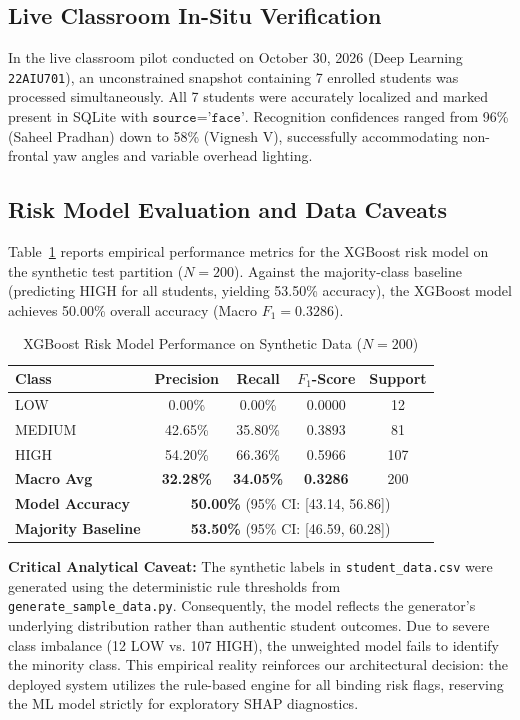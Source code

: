 \documentclass[conference]{IEEEtran}
\begin{document}
\subsection{Live Classroom In-Situ Verification}
In the live classroom pilot conducted on October 30, 2026 (Deep Learning \texttt{22AIU701}), an unconstrained snapshot containing 7 enrolled students was processed simultaneously. All 7 students were accurately localized and marked present in SQLite with $\texttt{source='face'}$. Recognition confidences ranged from 96\% (Saheel Pradhan) down to 58\% (Vignesh V), successfully accommodating non-frontal yaw angles and variable overhead lighting.

\subsection{Risk Model Evaluation and Data Caveats}
Table~\ref{tab:risk} reports empirical performance metrics for the XGBoost risk model on the synthetic test partition ($N=200$). Against the majority-class baseline (predicting HIGH for all students, yielding 53.50\% accuracy), the XGBoost model achieves 50.00\% overall accuracy (Macro $F_1 = 0.3286$).

\begin{table}[t]
\caption{XGBoost Risk Model Performance on Synthetic Data ($N=200$)}
\label{tab:risk}
\centering
\small
\begin{tabular}{lcccc}
\toprule
Class & Precision & Recall & $F_1$-Score & Support \\
\midrule
LOW & 0.00\% & 0.00\% & 0.0000 & 12 \\
MEDIUM & 42.65\% & 35.80\% & 0.3893 & 81 \\
HIGH & 54.20\% & 66.36\% & 0.5966 & 107 \\
\midrule
\textbf{Macro Avg} & \textbf{32.28\%} & \textbf{34.05\%} & \textbf{0.3286} & 200 \\
\textbf{Model Accuracy} & \multicolumn{4}{c}{\textbf{50.00\%} (95\% CI: [43.14, 56.86])} \\
\textbf{Majority Baseline} & \multicolumn{4}{c}{\textbf{53.50\%} (95\% CI: [46.59, 60.28])} \\
\bottomrule
\end{tabular}
\end{table}

\textbf{Critical Analytical Caveat:} The synthetic labels in \texttt{student\_data.csv} were generated using the deterministic rule thresholds from \texttt{generate\_sample\_data.py}. Consequently, the model reflects the generator's underlying distribution rather than authentic student outcomes. Due to severe class imbalance (12 LOW vs. 107 HIGH), the unweighted model fails to identify the minority class. This empirical reality reinforces our architectural decision: the deployed system utilizes the rule-based engine for all binding risk flags, reserving the ML model strictly for exploratory SHAP diagnostics.
\end{document}
